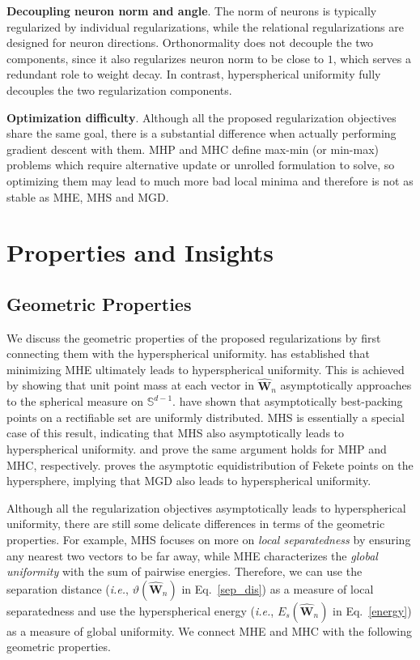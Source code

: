 \textbf{Decoupling neuron norm and angle}. The norm of neurons is typically regularized by individual regularizations, while the relational regularizations are designed for neuron directions. Orthonormality does not decouple the two components, since it also regularizes neuron norm to be close to $1$, which serves a redundant role to weight decay. In contrast, hyperspherical uniformity fully decouples the two regularization components.

\textbf{Optimization difficulty}. Although all the proposed regularization objectives share the same goal, there is a substantial difference when actually performing gradient descent with them. MHP and MHC define max-min (or min-max) problems which require alternative update or unrolled formulation to solve, so optimizing them may lead to much more bad local minima and therefore is not as stable as MHE, MHS and MGD.

\section{Properties and Insights}\label{theoretical_insights}

\subsection{Geometric Properties}

We discuss the geometric properties of the proposed regularizations by first connecting them with the hyperspherical uniformity. \cite{liu2018learning} has established that minimizing MHE ultimately leads to hyperspherical uniformity. This is achieved by showing that unit point mass at each vector in $\hat{\bm{W}}_n$ asymptotically approaches to the spherical measure on $\mathbb{S}^{d-1}$. \cite{kolmogorov1959varepsilon,borodachov2007asymptotics} have shown that asymptotically best-packing points on a rectifiable set are uniformly distributed. MHS is essentially a special case of this result, indicating that MHS also asymptotically leads to hyperspherical uniformity. \cite{borodachov2014asymptotics,borodachov2018optimal,erdelyi2013riesz} and \cite{kolmogorov1959varepsilon} prove the same argument holds for MHP and MHC, respectively. \cite{marzo2010equidistribution} proves the asymptotic equidistribution of Fekete points on the hypersphere, implying that MGD also leads to hyperspherical uniformity.
\par
Although all the regularization objectives asymptotically leads to hyperspherical uniformity, there are still some delicate differences in terms of the geometric properties. For example, MHS focuses on more on \emph{local separatedness} by ensuring any nearest two vectors to be far away, while MHE characterizes the \emph{global uniformity} with the sum of pairwise energies. Therefore, we can use the separation distance (\emph{i.e.}, $\vartheta(\hat{\bm{W}}_n)$ in Eq.~\eqref{sep_dis}) as a measure of local separatedness and use the hyperspherical energy (\emph{i.e.}, $E_s(\hat{\bm{W}}_n)$ in Eq.~\eqref{energy}) as a measure of global uniformity. We connect MHE and MHC with the following geometric properties.


